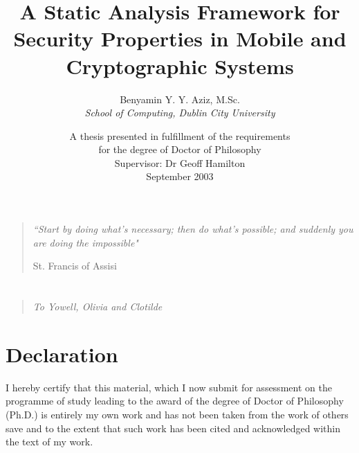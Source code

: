 \documentclass[10pt,a4paper,final,oneside,fleqn]{book}
\begin{document}

\title{\Large{\textbf{A Static Analysis Framework for Security Properties in Mobile and Cryptographic Systems}}\vspace{5mm}}
\author{\large{Benyamin Y. Y. Aziz, M.Sc.}\\
	  \normalsize{\textit{School of Computing, Dublin City University}}\vspace{60mm}
}
\date{\large{A thesis presented in fulfillment of the requirements}\\
	\large{for the degree of Doctor of Philosophy}\\
	\vspace{5mm}\large{Supervisor: Dr Geoff Hamilton}\\
	\vspace{5mm}\large{September 2003}
}
\renewcommand{\thepage}{\roman{page}}
\maketitle
\chapter*{}\thispagestyle{empty}
\begin{verse}
\textit{``Start by doing what's necessary; then do what's possible; and suddenly you are doing the impossible"}
\begin{flushright}
St. Francis of Assisi
\end{flushright}
\end{verse}
\chapter*{}\thispagestyle{empty}
\begin{verse}
\textit{To Yowell, Olivia and Clotilde}\\
\end{verse}
\chapter*{Declaration}
I hereby certify that this material, which I now submit for assessment on the programme of study leading to the award of the degree of Doctor of Philosophy (Ph.D.) is entirely my own work and has not been taken from the work of others save and to the extent that such work has been cited and acknowledged within the text of my work.\vspace{15mm}
\end{document}
